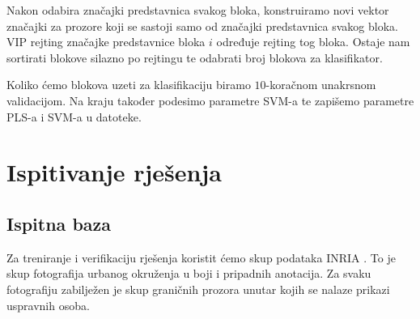 \documentclass[seminar]{fer}
\begin{document}
Nakon odabira značajki predstavnica svakog bloka, konstruiramo novi vektor značajki za prozore koji se sastoji samo od značajki predstavnica svakog bloka. VIP rejting značajke predstavnice bloka $i$ određuje rejting tog bloka. Ostaje nam sortirati blokove silazno po rejtingu te odabrati broj blokova za klasifikator. 

Koliko ćemo blokova uzeti za  klasifikaciju biramo $10$-koračnom unakrsnom validacijom.
Na kraju također podesimo parametre SVM-a te zapišemo parametre PLS-a i SVM-a u datoteke.

\chapter{Ispitivanje rješenja}
\section{Ispitna baza}

Za treniranje i verifikaciju rješenja koristit ćemo skup podataka INRIA \cite{DT05}. To je skup fotografija urbanog okruženja u boji i pripadnih anotacija. Za svaku fotografiju zabilježen je skup graničnih prozora  unutar kojih se nalaze prikazi uspravnih osoba.
\end{document}

